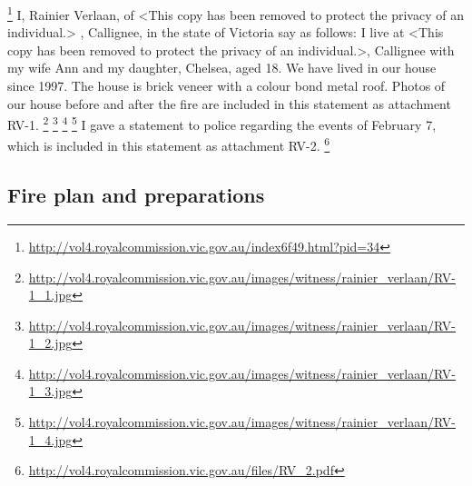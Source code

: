 \documentclass[a4paper]{article}
\begin{document}
    \footnote{\url{http://vol4.royalcommission.vic.gov.au/index6f49.html?pid=34}}
    I, Rainier Verlaan, of <This copy has been removed to protect the privacy of an individual.> , Callignee, in the state of Victoria say as follows:
    I live at <This copy has been removed to protect the privacy of an individual.>, Callignee with my wife Ann and my daughter, Chelsea, aged 18.
    We have lived in our house since 1997. The house is brick veneer with a colour bond metal roof. Photos of our house before and after the fire are included in this statement as attachment RV-1.
    \footnote{\url{http://vol4.royalcommission.vic.gov.au/images/witness/rainier_verlaan/RV-1_1.jpg}}
    \footnote{\url{http://vol4.royalcommission.vic.gov.au/images/witness/rainier_verlaan/RV-1_2.jpg}}
    \footnote{\url{http://vol4.royalcommission.vic.gov.au/images/witness/rainier_verlaan/RV-1_3.jpg}}
    \footnote{\url{http://vol4.royalcommission.vic.gov.au/images/witness/rainier_verlaan/RV-1_4.jpg}}
    I gave a statement to police regarding the events of February 7, which is included in this statement as attachment RV-2.
    \footnote{\url{http://vol4.royalcommission.vic.gov.au/files/RV_2.pdf}}

    \subsection{Fire plan and preparations}
\end{document}

